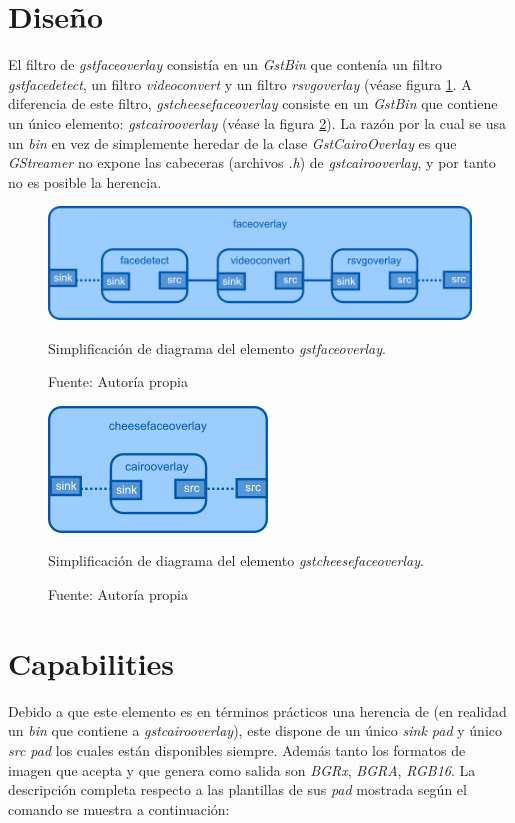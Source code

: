 \documentclass[a4paper,openright,12pt]{report}
\begin{document}
\section{Diseño}
El filtro de \textit{gstfaceoverlay} consistía en un \textit{GstBin} que
contenía un filtro \textit{gstfacedetect}, un filtro \textit{videoconvert} y
un filtro \textit{rsvgoverlay} (véase figura \ref{fig:faceoverlay-design}.
A diferencia de este filtro, \textit{gstcheesefaceoverlay} consiste en un
\textit{GstBin} que contiene un único elemento: \textit{gstcairooverlay} (véase
la figura \ref{fig:cheesefaceoverlay-design}). La razón por la cual se usa un
\textit{bin} en vez de simplemente heredar de la clase \textit{GstCairoOverlay}
es que \textit{GStreamer} no expone las cabeceras (archivos \textit{.h}) de
\textit{gstcairooverlay}, y por tanto no es posible la herencia.

\begin{figure}[!h]
  \centering
    \includegraphics[width=1.0\textwidth]{../images/faceoverlay-design.png}\par
  \caption{Simplificación de diagrama del elemento \textit{gstfaceoverlay}.}
    \label{fig:faceoverlay-design}
  \caption*{Fuente: Autoría propia}
\end{figure}

\begin{figure}[!h]
  \centering
    \includegraphics{../images/cheesefaceoverlay-design.png}\par
  \caption{Simplificación de diagrama del elemento \textit{gstcheesefaceoverlay}.}
    \label{fig:cheesefaceoverlay-design}
  \caption*{Fuente: Autoría propia}
\end{figure}

\section{Capabilities}
Debido a que este elemento es en términos prácticos una herencia de (en realidad
un \textit{bin} que contiene a \textit{gstcairooverlay}), este dispone de
un único \textit{sink pad} y único \textit{src pad} los cuales están disponibles
siempre. Además tanto los formatos de imagen que acepta y que genera como salida
son \textit{BGRx}, \textit{BGRA}, \textit{RGB16}. La descripción completa
respecto a las plantillas de sus \textit{pad} mostrada según el comando
 se muestra a continuación:
\end{document}
